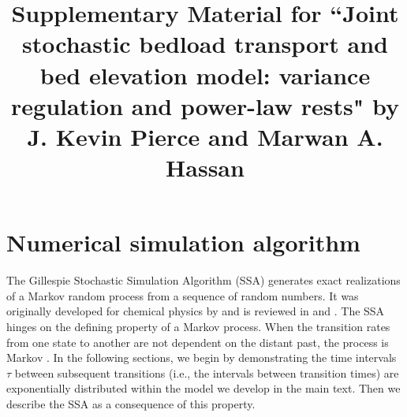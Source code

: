 \documentclass[11pt]{article}
\date{} %
\begin{document}
\title{Supplementary Material for ``Joint stochastic bedload transport and bed elevation model: variance regulation and power-law rests" by J. Kevin Pierce and Marwan A. Hassan}
\maketitle

\section{Numerical simulation algorithm}

The Gillespie Stochastic Simulation Algorithm (SSA) generates exact realizations of a Markov random process from a sequence of random numbers.
It was originally developed for chemical physics by \citet{Gillespie1977} and is reviewed in \citet{Gillespie1992} and \citet{Gillespie2007}.
The SSA hinges on the defining property of a Markov process. When the transition rates from one state to another are not dependent on the distant past, the process is Markov \citep[e.g.,][]{Cox1965}.
In the following sections, we begin by demonstrating the time intervals $\tau$ between subsequent transitions (i.e., the intervals between transition times) are exponentially distributed within the model we develop in the main text. Then we describe the SSA as a consequence of this property.
\end{document}
